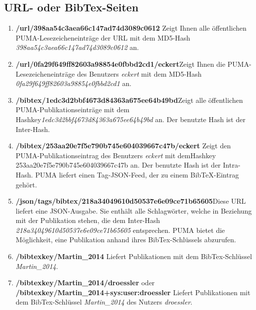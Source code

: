 \subsection{URL- oder BibTex-Seiten}
\label{subsec:hashSeiten}
\begin{enumerate}
    \item \textbf{/url/398aa54c3aea66c147ad74d3089c0612}\newline
    Zeigt Ihnen alle öffentlichen PUMA-Lesezeicheneinträge der URL mit dem MD5-Hash \textit{398aa54c3aea66c147ad74d3089c0612} an.
    \item \textbf{/url/0fa29f649ff82603a98854e0fbbd2cd1/eckert}\newline Zeigt Ihnen die PUMA-Lesezeicheneinträge des Benutzers \textit{eckert} mit dem MD5-Hash \textit{0fa29f649ff82603a98854e0fbbd2cd1} an.
	\item \textbf{/bibtex/1edc3d2bbf4673d84363a675ee64b49bd}\newline Zeigt alle öffentlichen PUMA-Publikationseinträge mit dem Hashkey\newline \textit{1edc3d2bbf4673d84363a675ee64b49bd} an. Der benutzte Hash ist der Inter-Hash.
    \item \textbf{/bibtex/253aa20e7f5e790b745e604039667c47b/eckert}\newline
    Zeigt den PUMA-Publikationseintrag des Benutzers \textit{eckert} mit dem\newline Hashkey 253aa20e7f5e790b745e604039667c47b an. Der benutzte Hash ist der Intra-Hash. PUMA liefert einen Tag-JSON-Feed, der zu einem BibTeX-Eintrag gehört.
    \item \textbf{/json/tags/bibtex/218a34049610d50537e6e09ce71b65605}\newline Diese URL liefert eine JSON-Ausgabe. Sie enthält alle Schlagwörter, welche in Beziehung mit der Publikation stehen, die dem Inter-Hash \textit{218a34049610d50537e6e09ce71b65605} entsprechen. PUMA bietet die Möglichkeit, eine Publikation anhand ihres BibTex-Schlüssels abzurufen.
    \item \textbf{/bibtexkey/Martin\_2014} \newline
    Liefert Publikationen mit dem BibTex-Schlüssel \textit{Martin\_2014}.
    \item \textbf{/bibtexkey/Martin\_2014/droessler} 
    oder \newline \textbf{/bibtexkey/Martin\_2014+sys:user:droessler}\newline
    Liefert Publikationen mit dem BibTex-Schlüssel \textit{Martin\_2014} des Nutzers \textit{droessler}.

\end{enumerate}

